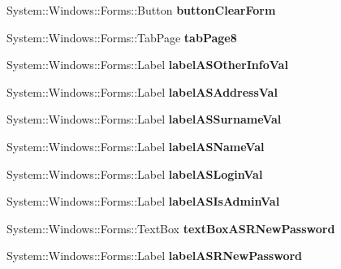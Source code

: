 \begin{DoxyCompactItemize}
System\+::\+Windows\+::\+Forms\+::\+Button {\bfseries button\+Clear\+Form}
\item 
\hypertarget{class_magazyn_1_1_magazin_a0e4e62b93af6ba14f2209db5beadf0a2}{}\label{class_magazyn_1_1_magazin_a0e4e62b93af6ba14f2209db5beadf0a2} 
System\+::\+Windows\+::\+Forms\+::\+Tab\+Page {\bfseries tab\+Page8}
\item 
\hypertarget{class_magazyn_1_1_magazin_a648574795bef5da79adb63f57872b12e}{}\label{class_magazyn_1_1_magazin_a648574795bef5da79adb63f57872b12e} 
System\+::\+Windows\+::\+Forms\+::\+Label {\bfseries label\+A\+S\+Other\+Info\+Val}
\item 
\hypertarget{class_magazyn_1_1_magazin_a36e356c3f7526a917583fb309f7b0e55}{}\label{class_magazyn_1_1_magazin_a36e356c3f7526a917583fb309f7b0e55} 
System\+::\+Windows\+::\+Forms\+::\+Label {\bfseries label\+A\+S\+Address\+Val}
\item 
\hypertarget{class_magazyn_1_1_magazin_acff06f7b3921c75631070a1bdb5c967a}{}\label{class_magazyn_1_1_magazin_acff06f7b3921c75631070a1bdb5c967a} 
System\+::\+Windows\+::\+Forms\+::\+Label {\bfseries label\+A\+S\+Surname\+Val}
\item 
\hypertarget{class_magazyn_1_1_magazin_a345420e99e81a7bab857824e4f9e0fcc}{}\label{class_magazyn_1_1_magazin_a345420e99e81a7bab857824e4f9e0fcc} 
System\+::\+Windows\+::\+Forms\+::\+Label {\bfseries label\+A\+S\+Name\+Val}
\item 
\hypertarget{class_magazyn_1_1_magazin_a0672dcf8e98fde2b1e24f8e6aa587597}{}\label{class_magazyn_1_1_magazin_a0672dcf8e98fde2b1e24f8e6aa587597} 
System\+::\+Windows\+::\+Forms\+::\+Label {\bfseries label\+A\+S\+Login\+Val}
\item 
\hypertarget{class_magazyn_1_1_magazin_ae98facecdd39183c4c06244e0bbc84e2}{}\label{class_magazyn_1_1_magazin_ae98facecdd39183c4c06244e0bbc84e2} 
System\+::\+Windows\+::\+Forms\+::\+Label {\bfseries label\+A\+S\+Is\+Admin\+Val}
\item 
\hypertarget{class_magazyn_1_1_magazin_aaf2666da09e7769ab6bd1d4361b4a371}{}\label{class_magazyn_1_1_magazin_aaf2666da09e7769ab6bd1d4361b4a371} 
System\+::\+Windows\+::\+Forms\+::\+Text\+Box {\bfseries text\+Box\+A\+S\+R\+New\+Password}
\item 
\hypertarget{class_magazyn_1_1_magazin_a18e91486d4eacb0d19b5b2f57f32670f}{}\label{class_magazyn_1_1_magazin_a18e91486d4eacb0d19b5b2f57f32670f} 
System\+::\+Windows\+::\+Forms\+::\+Label {\bfseries label\+A\+S\+R\+New\+Password}
\item 
\hypertarget{class_magazyn_1_1_magazin_a33f2e8559215153d36af3b7ca0952d70}{}\label{class_magazyn_1_1_magazin_a33f2e8559215153d36af3b7ca0952d70} 

\end{DoxyCompactItemize}
